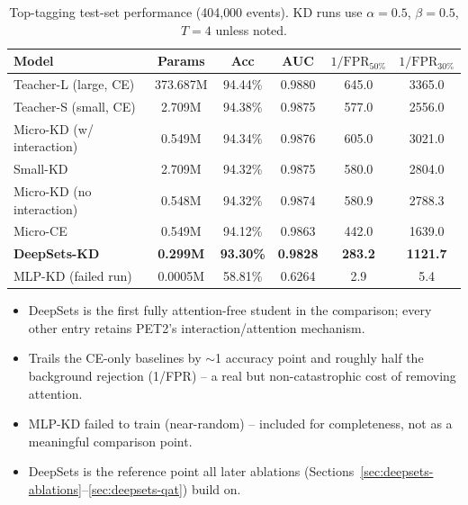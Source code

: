 \begin{table}[h]
    \centering
    \small
    \begin{tabular}{lccccc}
        \toprule
        Model & Params & Acc & AUC & $1/\mathrm{FPR}_{50\%}$ & $1/\mathrm{FPR}_{30\%}$ \\
        \midrule
        Teacher-L (large, CE)             & 373.687M & 94.44\% & 0.9880 & 645.0 & 3365.0 \\
        Teacher-S (small, CE)             & 2.709M & 94.38\% & 0.9875 & 577.0 & 2556.0 \\
        Micro-KD (w/ interaction)         & 0.549M & 94.34\% & 0.9876 & 605.0 & 3021.0 \\
        Small-KD                          & 2.709M & 94.32\% & 0.9875 & 580.0 & 2804.0 \\
        Micro-KD (no interaction)         & 0.548M & 94.32\% & 0.9874 & 580.9 & 2788.3 \\
        Micro-CE                          & 0.549M & 94.12\% & 0.9863 & 442.0 & 1639.0 \\
        \textbf{DeepSets-KD}              & \textbf{0.299M} & \textbf{93.30\%} & \textbf{0.9828} & \textbf{283.2} & \textbf{1121.7} \\
        MLP-KD (failed run)               & 0.0005M & 58.81\% & 0.6264 & 2.9 & 5.4 \\
        \bottomrule
    \end{tabular}
    \caption{Top-tagging test-set performance (404{,}000 events). KD runs
    use $\alpha=0.5$, $\beta=0.5$, $T=4$ unless noted.}
    \label{tab:deepsets-mlp-comparison}
\end{table}

\begin{itemize}
    \item DeepSets is the first fully attention-free student in the
    comparison; every other entry retains PET2's interaction/attention
    mechanism.
    \item Trails the CE-only baselines by $\sim$1 accuracy point and
    roughly half the background rejection (1/FPR) -- a real but
    non-catastrophic cost of removing attention.
    \item MLP-KD failed to train (near-random) -- included for
    completeness, not as a meaningful comparison point.
    \item DeepSets is the reference point all later ablations
    (Sections~\ref{sec:deepsets-ablations}--\ref{sec:deepsets-qat}) build
    on.
\end{itemize}

